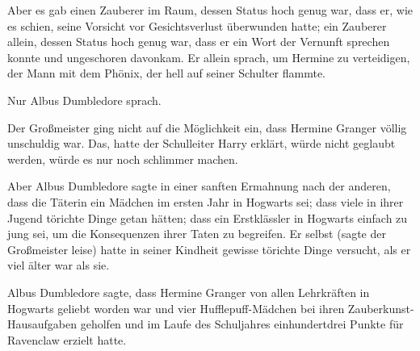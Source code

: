 Aber es gab einen Zauberer im Raum, dessen Status hoch genug war, dass er, wie es schien, seine Vorsicht vor Gesichtsverlust überwunden hatte; ein Zauberer allein, dessen Status hoch genug war, dass er ein Wort der Vernunft sprechen konnte und ungeschoren davonkam. Er allein sprach, um Hermine zu verteidigen, der Mann mit dem Phönix, der hell auf seiner Schulter flammte.

Nur Albus Dumbledore sprach.

Der Großmeister ging nicht auf die Möglichkeit ein, dass Hermine Granger völlig unschuldig war. Das, hatte der Schulleiter Harry erklärt, würde nicht geglaubt werden, würde es nur noch schlimmer machen.

Aber Albus Dumbledore sagte in einer sanften Ermahnung nach der anderen, dass die Täterin ein Mädchen im ersten Jahr in Hogwarts sei; dass viele in ihrer Jugend törichte Dinge getan hätten; dass ein Erstklässler in Hogwarts einfach zu jung sei, um die Konsequenzen ihrer Taten zu begreifen. Er selbst (sagte der Großmeister leise) hatte in seiner Kindheit gewisse törichte Dinge versucht, als er viel älter war als sie.

Albus Dumbledore sagte, dass Hermine Granger von allen Lehrkräften in Hogwarts geliebt worden war und vier Hufflepuff-Mädchen bei ihren Zauberkunst-Hausaufgaben geholfen und im Laufe des Schuljahres einhundertdrei Punkte für Ravenclaw erzielt hatte.

